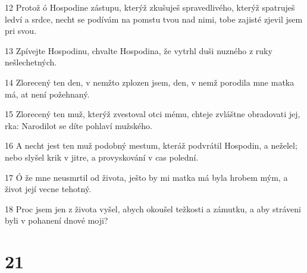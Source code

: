 \par 12 Protož ó Hospodine zástupu, kterýž zkušuješ spravedlivého, kterýž spatruješ ledví a srdce, necht se podívám na pomstu tvou nad nimi, tobe zajisté zjevil jsem pri svou.
\par 13 Zpívejte Hospodinu, chvalte Hospodina, že vytrhl duši nuzného z ruky nešlechetných.
\par 14 Zlorecený ten den, v nemžto zplozen jsem, den, v nemž porodila mne matka má, at není požehnaný.
\par 15 Zlorecený ten muž, kterýž zvestoval otci mému, chteje zvláštne obradovati jej, rka: Narodilot se díte pohlaví mužského.
\par 16 A necht jest ten muž podobný mestum, kteráž podvrátil Hospodin, a neželel; nebo slyšel krik v jitre, a provyskování v cas polední.
\par 17 Ó že mne neusmrtil od života, ješto by mi matka má byla hrobem mým, a život její vecne tehotný.
\par 18 Proc jsem jen z života vyšel, abych okoušel težkosti a zámutku, a aby stráveni byli v pohanení dnové moji?

\chapter{21}

